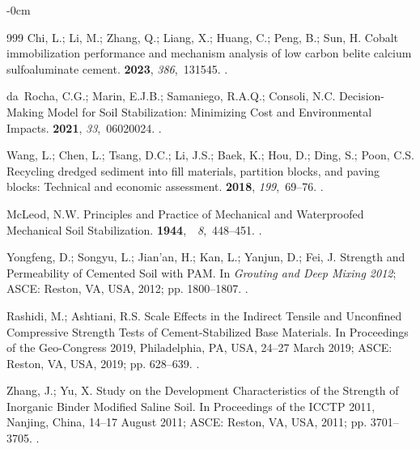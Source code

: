 \documentclass[sustainability,article,accept,pdftex,moreauthors]{Definitions/mdpi}
\begin{document}
{{\begin{adjustwidth}{-\extralength}{0cm}
\begin{thebibliography}{999}
Chi, L.; Li, M.; Zhang, Q.; Liang, X.; Huang, C.; Peng, B.; Sun, H.
\newblock Cobalt immobilization performance and mechanism analysis of low
  carbon belite calcium sulfoaluminate cement.
 {\bf 2023}, {\em
  386},~131545.
.

da~Rocha, C.G.; Marin, E.J.B.; Samaniego, R.A.Q.; Consoli, N.C.
\newblock Decision-Making Model for Soil Stabilization: Minimizing Cost and
  Environmental Impacts.
 {\bf 2021}, {\em
  33},~06020024.
.

Wang, L.; Chen, L.; Tsang, D.C.; Li, J.S.; Baek, K.; Hou, D.; Ding, S.; Poon,
  C.S.
\newblock Recycling dredged sediment into fill materials, partition blocks, and
  paving blocks: Technical and economic assessment.
 {\bf 2018}, {\em 199},~69--76.
.

McLeod, N.W.
\newblock Principles and Practice of Mechanical and Waterproofed Mechanical
  Soil Stabilization.
 \mbox{{\bf 1944}, {\em
  8},~448--451.}
.

Yongfeng, D.; Songyu, L.; Jian'an, H.; Kan, L.; Yanjun, D.; Fei, J. Strength
  and Permeability of Cemented Soil with PAM.\linebreak 
\newblock In {\em Grouting and Deep Mixing 2012}; ASCE: Reston, VA, USA,  2012; pp. 1800--1807.
.

Rashidi, M.; Ashtiani, R.S. Scale Effects in the Indirect Tensile and
  Unconfined Compressive Strength Tests of Cement-Stabilized Base Materials.
\newblock In Proceedings of the Geo-Congress 2019, Philadelphia, PA, USA, 24--27 March 2019; ASCE: Reston, VA, USA,  2019; pp. 628--639.
.

Zhang, J.; Yu, X. Study on the Development Characteristics of the Strength of
  Inorganic Binder Modified Saline Soil.\linebreak 
\newblock In Proceedings of the ICCTP 2011, Nanjing, China, 14--17 August 2011; ASCE: Reston, VA, USA, 2011; pp. 3701--3705.
.


\end{thebibliography}
\end{adjustwidth}}}
\end{document}

